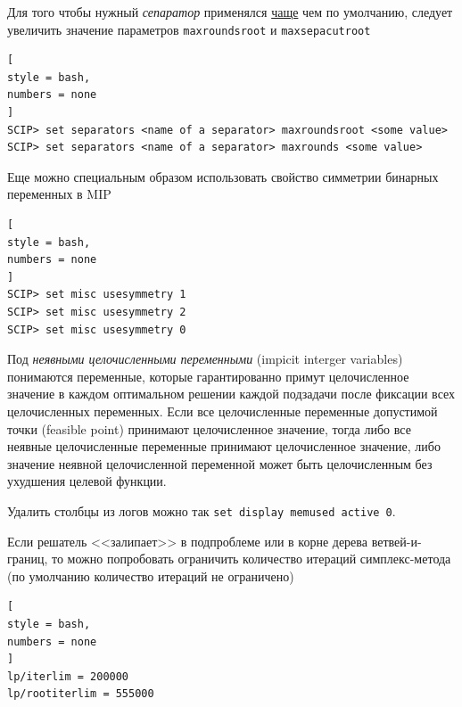 \documentclass[%
	11pt,
	a4paper,
	utf8,
		]{article}
\begin{document}
Для того чтобы нужный \emph{сепаратор} применялся \underline{чаще} чем по умолчанию, следует увеличить значение параметров \verb|maxroundsroot| и \verb|maxsepacutroot|
\begin{lstlisting}[
style = bash,
numbers = none
]
SCIP> set separators <name of a separator> maxroundsroot <some value>
SCIP> set separators <name of a separator> maxrounds <some value>
\end{lstlisting}

Еще можно специальным образом использовать свойство симметрии бинарных переменных в MIP
\begin{lstlisting}[
style = bash,
numbers = none
]
SCIP> set misc usesymmetry 1
SCIP> set misc usesymmetry 2
SCIP> set misc usesymmetry 0
\end{lstlisting}

Под \emph{неявными целочисленными переменными} (impicit interger variables) понимаются переменные, которые гарантированно примут целочисленное значение в каждом оптимальном решении каждой подзадачи после фиксации всех целочисленных переменных. Если все целочисленные переменные допустимой точки (feasible point) принимают целочисленное значение, тогда либо все неявные целочисленные переменные принимают целочисленное значение, либо значение неявной целочисленной переменной может быть целочисленным без ухудшения целевой функции.

Удалить столбцы из логов можно так \verb|set display memused active 0|.


Если решатель <<залипает>> в подпроблеме или в корне дерева ветвей-и-границ, то можно попробовать ограничить количество итераций симплекс-метода (по умолчанию количество итераций не ограничено)
\begin{lstlisting}[
style = bash,
numbers = none
]
lp/iterlim = 200000
lp/rootiterlim = 555000
\end{lstlisting}



\listoffigures{}
\end{document}
